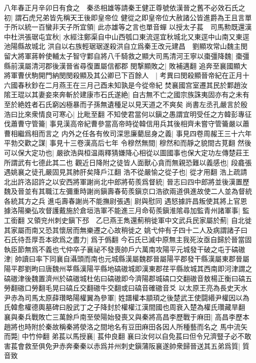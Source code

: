 八年春正月辛卯日有食之　秦丞相雄等請秦王健正尊號依漢晉之舊不必效石氏之初|{
	謂石虎兄弟皆先稱天王後即皇帝位}
健從之即皇帝位大赦諸公皆進爵為王且言單于所以統一百蠻非天子所宜領|{
	此亦雄等之言也單音蟬}
以授太子萇　司馬勲既還漢中杜洪張琚屯宜秋|{
	水經注鄭渠自中山西瓠口東流逕宜秋城北又東逕中山南又東逕池陽縣故城北}
洪自以右族輕琚琚遂殺洪自立爲秦王改元建昌　劉顯攻常山魏主閔留大將軍蔣幹使輔太子智守鄴自將八千騎救之顯大司馬清河王寧以棗彊降魏|{
	棗彊縣前漢屬清河郡後漢晉省尋復置屬信都郡}
閔撃顯敗之|{
	敗補邁翻}
追奔至襄國顯大將軍曹伏駒開門納閔閔殺顯及其公卿已下百餘人　|{
	考異曰閔殺顯晉帝紀在正月十六國春秋鈔在二月燕王在三月己酉未知孰是今從帝紀}
焚襄國宫室遷其民於鄴趙汝隂王琨以其妻妾來奔斬於建康市石氏遂絶|{
	自古無不亡之國宗族誅夷固亦有之未有至於絶姓者石氏窮凶極暴而子孫無遺種足以見天道之不爽矣}
尚書左丞孔嚴言於殷浩曰比來衆情良可寒心|{
	比毗至翻}
不知使君當何以鎭之愚謂宜明受任之方韓彭專征伐蕭曹守管籥|{
	事見漢高帝紀曹參當高帝時從韓信用兵其後相齊未嘗守管籥嚴以蕭曹相繼爲相而言之}
内外之任各有攸司深思廉藺屈身之義|{
	事見四卷周赧王三十六年}
平勃交歡之謀|{
	事見十三卷漢高后七年}
令穆然無間|{
	穆然和而靜之貌間古莧翻}
然後可以保大定功也|{
	嚴欲浩與桓温兩釋猜嫌降心相從以圖國事也保大定功左傳楚莊王所謂武有七德此其二也}
觀近日降附之徒皆人面獸心貪而無親恐難以義感也|{
	段龕張遇姚襄之徒孔嚴固見其肺肝矣降戶江翻}
浩不從嚴愉之從子也|{
	從才用翻}
浩上疏請北出許洛詔許之以安西將軍謝尚北中郎將荀羨爲督統|{
	晉志曰四中郎將並後漢置歷魏及晉並有其職江左彌重時謝尚鎭壽春荀羨鎭京口浩欲兩道俱進故使二人並為督統各統其方之兵}
進屯壽春謝尚不能撫尉張遇|{
	尉與慰同}
遇怒據許昌叛使其將上官恩據洛陽樂弘攻督護戴施於倉垣浩軍不能進三月命荀羨鎭淮隂尋加監青州諸軍事|{
	監工銜翻}
又領兖州刺史鎭下邳　乙巳燕王雋還薊稍徙軍中文武兵民家屬於薊|{
	自北徙其家屬而南又恐其懷居而無樂遷之心故稍徙之}
姚弋仲有子四十二人及病謂諸子曰石氏待吾厚吾本欲爲之盡力|{
	爲于僞翻}
今石氏已滅中原無主我死汝亟自歸於晉當固執臣節無爲不義也弋仲卒子襄祕不發喪帥戶六萬南攻陽平元城發干破之屯于碻磝津|{
	帥讀曰率下同襄自灄頭而南也元城縣漢屬魏郡晉屬陽平郡發干縣漢屬東郡晉屬陽平郡劉昫曰唐魏州莘縣漢陽平縣地碻磝城即漢東郡荏平縣故城其西南即河津謂之碻磝津後魏置濟州於碻磝城杜佑曰碻磝即今濟陽郡城碻口交翻磝音敖楊正衡曰碻五勞翻磝口勞翻毛晃曰碻丘交翻磝牛交翻或曰碻音確磝音爻}
以太原王亮為長史天水尹赤為司馬太原薛瓚略陽權翼為參軍|{
	姓譜權本顓頊之後楚武王使闘緡尹權因以為氏韓愈權德輿墓碑曰殷武丁之子降封於權權江漢間國也周衰入楚為權氏瓚藏旱翻}
襄與秦兵戰敗亡三萬餘戶南至滎陽始發喪又與秦將高昌李歷戰于麻田|{
	高昌李歷本趙將也時附於秦故稱秦將滎洛之間地名有豆田麻田各因人所種藝而名之}
馬中流矢而斃|{
	中竹仲翻}
弟萇以馬授襄|{
	萇仲良翻}
襄曰汝何以自免萇曰但令兄濟豎子必不敢害萇會救至俱免尹赤奔秦秦以赤爲并州刺史鎭蒲阪襄遂帥衆歸晉送其五弟爲質|{
	質音致}
